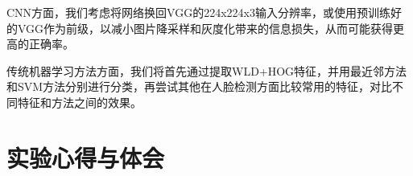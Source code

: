 \documentclass[UTF8]{ctexart}
\begin{document}
CNN方面，我们考虑将网络换回VGG的224x224x3输入分辨率，或使用预训练好的VGG作为前级，以减小图片降采样和灰度化带来的信息损失，从而可能获得更高的正确率。

传统机器学习方法方面，我们将首先通过提取WLD+HOG特征，并用最近邻方法和SVM方法分别进行分类，再尝试其他在人脸检测方面比较常用的特征，对比不同特征和方法之间的效果。


\section{实验心得与体会}





\end{document}
